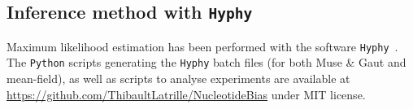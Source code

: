 \subsection{Inference method with \texttt{Hyphy}}
\label{subsec:inference-method-with-hyphy}

Maximum likelihood estimation has been performed with the software \texttt{Hyphy}~\citep{Pond2005}.
The \texttt{Python} scripts generating the \texttt{Hyphy} batch files (for both Muse \& Gaut and mean-field), as well as scripts to analyse experiments are available at \url{https://github.com/ThibaultLatrille/NucleotideBias} under MIT license.

